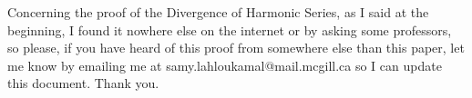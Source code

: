 \documentclass[12pt]{article}
\theoremstyle{definition}
\begin{document}
Concerning the proof of the Divergence of Harmonic Series, as I said at the beginning, I found it nowhere else on the internet or by asking some professors, so please, if you have heard of this proof from somewhere else than this paper, let me know by emailing me at samy.lahloukamal@mail.mcgill.ca so I can update this document. Thank you.

\newpage


\end{document}
